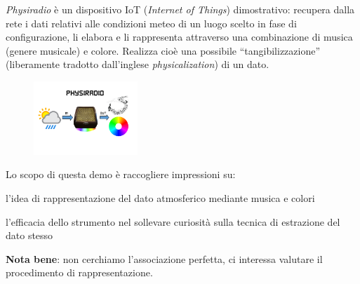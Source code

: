 \documentclass[12pt,a4paper]{report}
\begin{document}
\begin{mdframed}[leftmargin=-40pt,rightmargin=-40pt]


\textit{Physiradio} è un dispositivo IoT (\textit{Internet of Things}) dimostrativo: recupera dalla rete i dati relativi alle condizioni meteo di un luogo scelto in fase di configurazione, li elabora e li rappresenta attraverso una combinazione di musica (genere musicale) e colore. Realizza cioè una possibile ``tangibilizzazione'' (liberamente tradotto dall'inglese \textit{physicalization}) di un dato.

\setlength\intextsep{0pt}
\begin{figure} %
	\begin{center}
		\includegraphics[width=0.35\textwidth]{Immagini/SCHEMA_PHYSIRADIO.png}
	\end{center}
\end{figure}


Lo scopo di questa demo è raccogliere impressioni su:
\begin{compactitem}
	\item l'idea di rappresentazione del dato atmosferico mediante musica e colori
	\item l'efficacia dello strumento nel sollevare curiosità sulla tecnica di estrazione del dato stesso
\end{compactitem}
\textbf{Nota bene}: non cerchiamo l'associazione perfetta, ci interessa valutare il procedimento di rappresentazione.
%


\end{mdframed}
\end{document}
